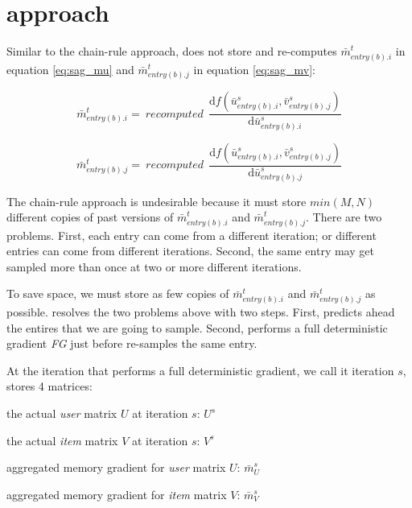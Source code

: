 \section{approach}
Similar to the chain-rule approach, \tool does not store and re-computes $\bar{m}_{entry(b).i}^{t}$ in equation \ref{eq:sag_mu} and $\bar{m}_{entry(b).j}^{t}$ in equation \ref{eq:sag_mv}:

\begin{equation} \label{eq:sagre_mi}
  \bar{m}_{entry(b).i}^{t} =\:recomputed\:\:\frac{\text{d}f(\bar{u}_{entry(b).i}^{s}, \bar{v}_{entry(b).j}^{s})}{\text{d}\bar{u}_{entry(b).i}^{s}}
\end{equation}

\begin{equation} \label{eq:sagre_mj}
  \bar{m}_{entry(b).j}^{t} =\:recomputed\:\:\frac{\text{d}f(\bar{u}_{entry(b).i}^{s}, \bar{v}_{entry(b).j}^{s})}{\text{d}\bar{u}_{entry(b).j}^{s}}
\end{equation}

The chain-rule approach is undesirable because it must store $min(M,N)$ different copies of past versions of $\bar{m}_{entry(b).i}^{t}$ and $\bar{m}_{entry(b).j}^{t}$.
There are two problems.  First, each entry can come from a different iteration; or different entries can come from different iterations.
Second, the same entry may get sampled more than once at two or more different iterations.

To save space, we must store as few copies of $\bar{m}_{entry(b).i}^{t}$ and $\bar{m}_{entry(b).j}^{t}$ as possible.
\tool resolves the two problems above with two steps.
First, \tool predicts ahead the entires that we are going to sample.
Second, \tool performs a full deterministic gradient \emph{FG} just before \tool re-samples the same entry.

At the iteration that \tool performs a full deterministic gradient, we call it iteration $s$, \tool stores 4 matrices:
\begin{sloppy}
\begin{compactitem}
\item the actual \emph{user} matrix $U$ at iteration $s$: $U^{s}$
\item the actual \emph{item} matrix $V$ at iteration $s$: $V^{s}$
\item aggregated memory gradient for \emph{user} matrix $U$: $\bar{m}_{U}^{s}$
\item aggregated memory gradient for \emph{item} matrix $V$: $\bar{m}_{V}^{s}$
\end{compactitem}
\end{sloppy}


